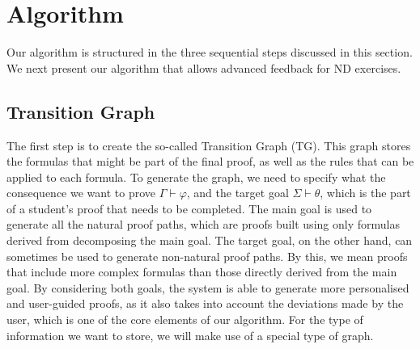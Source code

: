 \section{Algorithm}
Our algorithm is structured in the three sequential steps discussed in this section.
We next present our algorithm that allows advanced feedback for ND exercises.


\subsection{Transition Graph}
The first step is to create the so-called Transition Graph (TG). This graph stores the formulas that might be part of the final proof, as well as the rules that can be applied to each formula. 
To generate the graph, we need to specify what the consequence we want to prove \(\Gamma \vdash \varphi\), and the target goal \(\Sigma \vdash \theta\), which is the part of a student's proof that needs to be completed. The main goal is used to generate all the natural proof paths, which are proofs built using only formulas derived from decomposing the main goal. The target goal, on the other hand, can sometimes be used to generate non-natural proof paths. By this, we mean proofs that include more complex formulas than those directly derived from the main goal. By considering both goals, the system is able to generate more personalised and user-guided proofs, as it also takes into account the deviations made by the user, which is one of the core elements of our algorithm. For the type of information we want to store, we will make use of a special type of graph.

